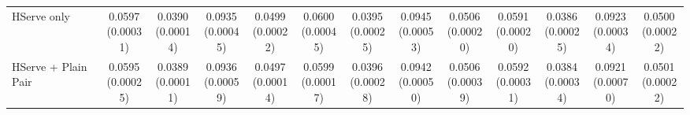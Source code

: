 \begin{table}[t]
\begin{tabular*}{\textwidth}{@{\extracolsep{\fill}} l *{12}{c} @{}}
HServe only & \shortstack[c]{0.0597\\[-1pt]{\tiny(0.00031)}} & \shortstack[c]{0.0390\\[-1pt]{\tiny(0.00014)}} & \shortstack[c]{0.0935\\[-1pt]{\tiny(0.00045)}} & \shortstack[c]{0.0499\\[-1pt]{\tiny(0.00022)}} & \shortstack[c]{0.0600\\[-1pt]{\tiny(0.00045)}} & \shortstack[c]{0.0395\\[-1pt]{\tiny(0.00025)}} & \shortstack[c]{0.0945\\[-1pt]{\tiny(0.00053)}} & \shortstack[c]{0.0506\\[-1pt]{\tiny(0.00020)}} & \shortstack[c]{0.0591\\[-1pt]{\tiny(0.00020)}} & \shortstack[c]{0.0386\\[-1pt]{\tiny(0.00025)}} & \shortstack[c]{0.0923\\[-1pt]{\tiny(0.00034)}} & \shortstack[c]{0.0500\\[-1pt]{\tiny(0.00022)}} \\
\addlinespace[1pt]
HServe + Plain Pair & \shortstack[c]{0.0595\\[-1pt]{\tiny(0.00025)}} & \shortstack[c]{0.0389\\[-1pt]{\tiny(0.00011)}} & \shortstack[c]{0.0936\\[-1pt]{\tiny(0.00059)}} & \shortstack[c]{0.0497\\[-1pt]{\tiny(0.00014)}} & \shortstack[c]{0.0599\\[-1pt]{\tiny(0.00017)}} & \shortstack[c]{0.0396\\[-1pt]{\tiny(0.00028)}} & \shortstack[c]{0.0942\\[-1pt]{\tiny(0.00050)}} & \shortstack[c]{0.0506\\[-1pt]{\tiny(0.00039)}} & \shortstack[c]{0.0592\\[-1pt]{\tiny(0.00031)}} & \shortstack[c]{0.0384\\[-1pt]{\tiny(0.00034)}} & \shortstack[c]{0.0921\\[-1pt]{\tiny(0.00070)}} & \shortstack[c]{0.0501\\[-1pt]{\tiny(0.00022)}} \\

\end{tabular*}
\end{table}
